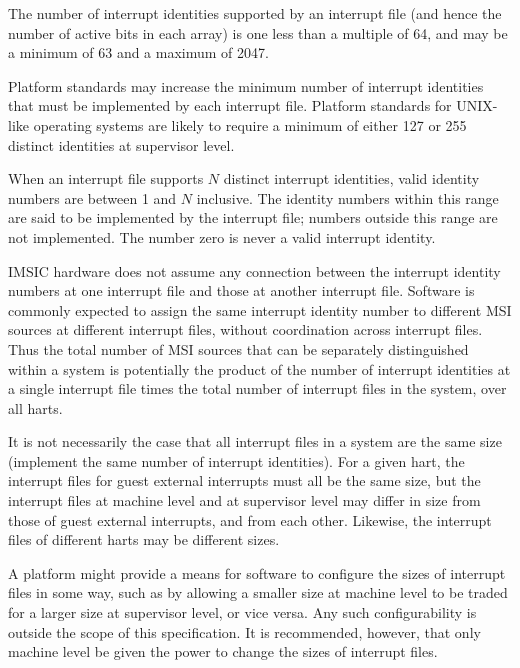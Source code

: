 The number of interrupt identities supported by an interrupt file
(and hence the number of active bits in each array) is one less than a
multiple of 64, and may be a minimum of 63 and a maximum of 2047.

\begin{commentary}
Platform standards may increase the minimum number of interrupt
identities that must be implemented by each interrupt file.
Platform standards for UNIX-like operating systems are likely
to require a minimum of either 127 or 255 distinct identities at
supervisor level.
\end{commentary}

When an interrupt file supports $N$ distinct interrupt identities,
valid identity numbers are between 1 and $N$ inclusive.
The identity numbers within this range are said to be implemented by
the interrupt file;
numbers outside this range are not implemented.
The number zero is never a valid interrupt identity.

IMSIC hardware does not assume any connection between the interrupt
identity numbers at one interrupt file and those at another interrupt
file.
Software is commonly expected to assign the same interrupt identity
number to different MSI sources at different interrupt files, without
coordination across interrupt files.
Thus the total number of MSI sources that can be separately
distinguished within a system is potentially the product of the number
of interrupt identities at a single interrupt file times the total
number of interrupt files in the system, over all harts.

It is not necessarily the case that all interrupt files in a system are
the same size (implement the same number of interrupt identities).
For a given hart, the interrupt files for guest external interrupts
must all be the same size, but the interrupt files at machine level
and at supervisor level may differ in size from those of guest external
interrupts, and from each other.
Likewise, the interrupt files of different harts may be different
sizes.

A platform might provide a means for software to configure the sizes
of interrupt files in some way, such as by allowing a smaller size at
machine level to be traded for a larger size at supervisor level, or
vice versa.
Any such configurability is outside the scope of this specification.
It is recommended, however, that only machine level be given the power
to change the sizes of interrupt files.

